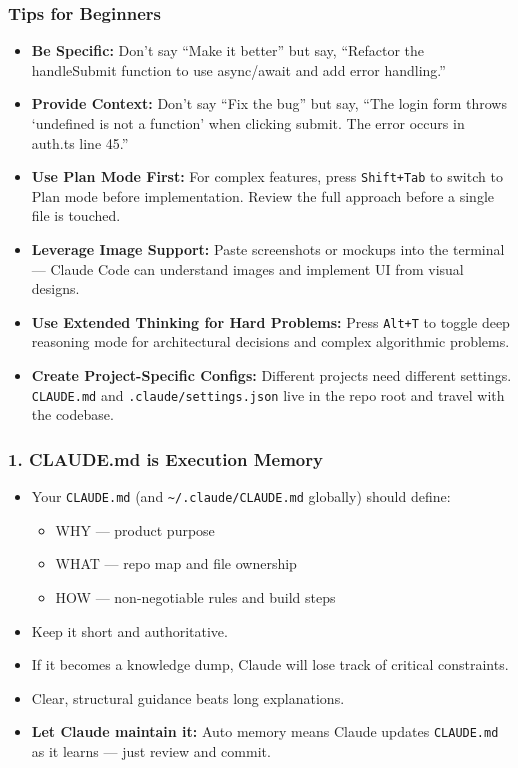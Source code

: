 \begin{frame}[fragile]\frametitle{Tips for Beginners}
  \begin{itemize}
    \item \textbf{Be Specific:}
    Don't say ``Make it better'' but say, ``Refactor the handleSubmit function to use async/await and add error handling.''

    \item \textbf{Provide Context:} Don't say ``Fix the bug'' but say, ``The login form throws `undefined is not a function' when clicking submit. The error occurs in auth.ts line 45.''

    \item \textbf{Use Plan Mode First:} For complex features, press \texttt{Shift+Tab} to switch to Plan mode before implementation. Review the full approach before a single file is touched.

    \item \textbf{Leverage Image Support:} Paste screenshots or mockups into the terminal --- Claude Code can understand images and implement UI from visual designs.

    \item \textbf{Use Extended Thinking for Hard Problems:} Press \texttt{Alt+T} to toggle deep reasoning mode for architectural decisions and complex algorithmic problems.

    \item \textbf{Create Project-Specific Configs:} Different projects need different settings. \texttt{CLAUDE.md} and \texttt{.claude/settings.json} live in the repo root and travel with the codebase.
  \end{itemize}
\end{frame}

\begin{frame}[fragile]\frametitle{1. CLAUDE.md is Execution Memory}
  \begin{itemize}
    \item Your \texttt{CLAUDE.md} (and \texttt{\textasciitilde/.claude/CLAUDE.md} globally) should define:
    \begin{itemize}
        \item WHY --- product purpose
        \item WHAT --- repo map and file ownership
        \item HOW --- non-negotiable rules and build steps
    \end{itemize}
    \item Keep it short and authoritative.
    \item If it becomes a knowledge dump, Claude will lose track of critical constraints.
    \item Clear, structural guidance beats long explanations.
    \item \textbf{Let Claude maintain it:} Auto memory means Claude updates \texttt{CLAUDE.md} as it learns --- just review and commit.
  \end{itemize}
\end{frame}

